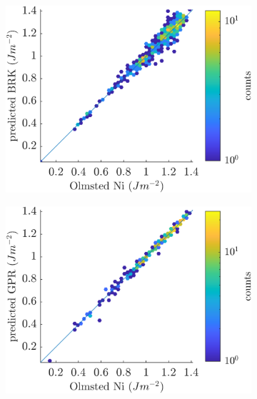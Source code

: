 \documentclass[final,twocolumn,12pt]{elsarticle}
\begin{document}
\begin{figure}[!htb]
     \centering
     \begin{subfigure}[b]{0.32\textwidth}
         \includegraphics[width=\textwidth]{figures/resubloss-ni-brk.png}
         \caption{}
         \label{fig:resubloss-ni-brk}
     \end{subfigure}
     \hfill
     \begin{subfigure}[b]{0.32\textwidth}
         \includegraphics[width=\textwidth]{figures/resubloss-ni-gpr.png}
         \caption{}
         \label{fig:resubloss-ni-gpr}
     \end{subfigure}
     \hfill
     \begin{subfigure}[b]{0.32\textwidth}

\end{subfigure}
\end{figure}
\end{document}
